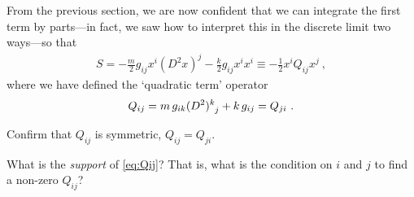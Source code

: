 % 
% 


From the previous section, we are now confident that we can integrate the first term by parts---in fact, we saw how to interpret this in the discrete limit two ways---so that
\begin{align}
    S = 
    -
    \frac{m}{2} g_{ij}x^i (D^2x)^j 
    - \frac{k}{2} g_{ij} x^ix^i
    \equiv
    -\frac{1}{2}x^i Q_{ij} x^j
    \ ,
    \label{eq:HO:action:discretized:integrated}
\end{align}
where we have defined the `quadratic term' operator
\begin{align}
    Q_{ij} = 
    m\, g_{ik}(D^2)\aij{k}{j} 
    + 
    k\, g_{ij} 
    = Q_{ji} \ .
    \label{eq:Qij}
\end{align}
\begin{exercise}
Confirm that $Q_{ij}$ is symmetric, $Q_{ij} = Q_{ji}$. 
\end{exercise}
\begin{exercise}
What is the \emph{support} of \eqref{eq:Qij}? That is, what is the condition on $i$ and $j$ to find a non-zero $Q_{ij}$?
\end{exercise}

